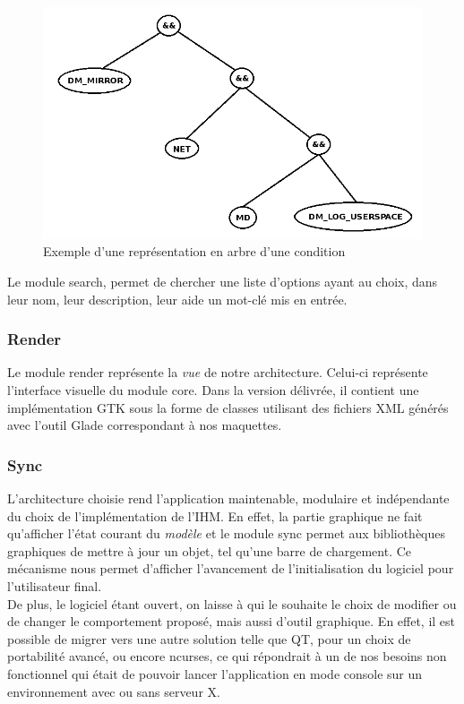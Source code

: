 \documentclass[17pts]{report}
\begin{document}
\begin{figure}[H]
    \includegraphics[scale=0.5]{illustrations/condition_tree.png}
    \centering
    \caption{Exemple d'une représentation en arbre d'une condition}
    \label{fig:condTree}
\end{figure}

Le module search, permet de chercher une liste d'options ayant au choix, dans
leur nom, leur description, leur aide un mot-clé mis en entrée.

\subsubsection{Render}
\label{ssub:Render}
Le module render représente la \textit{vue} de notre architecture.  Celui-ci
représente l'interface visuelle du module core.  Dans la version délivrée, il
contient une implémentation GTK sous la forme de classes utilisant des fichiers
XML générés avec l'outil Glade correspondant à nos maquettes.

\subsubsection{Sync}
\label{ssub:Sync}
L'architecture choisie rend l'application maintenable, modulaire et
indépendante du choix de l'implémentation de l'IHM. En effet, la partie
graphique ne fait qu'afficher l'état courant du \textit{modèle} et le module
sync permet aux bibliothèques graphiques de mettre à jour un objet, tel qu'une
barre de chargement. Ce mécanisme nous permet d'afficher l'avancement de
l'initialisation du logiciel pour l'utilisateur final.  \\

De plus, le logiciel étant ouvert, on laisse à qui le souhaite le choix de
modifier ou de changer le comportement proposé, mais aussi d'outil graphique.
En effet, il est possible de migrer vers une autre solution telle que QT, pour
un choix de portabilité avancé,  ou encore ncurses, ce qui répondrait à un de
nos besoins non fonctionnel qui était de pouvoir lancer l'application en mode
console sur un environnement avec ou sans serveur X.
\end{document}
